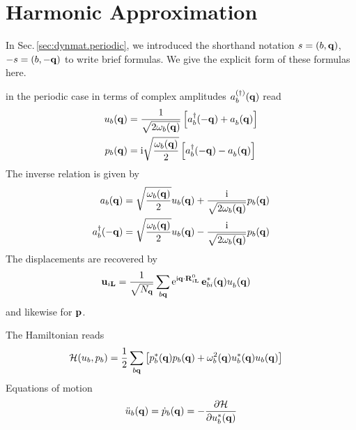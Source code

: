 \section{Harmonic Approximation}
\label{app:formulas.ha}
In Sec.\,\ref{sec:dynmat.periodic}, we introduced the shorthand notation $s=(b, {\bf q})$, $-s=(b, -{\bf q})$ to write brief formulas. We give the explicit form of these formulas here.

 in the periodic case in terms of complex amplitudes $a^{(\dagger)}_b ({\bf q})$ read
\begin{subequations}
	\label{eq:u_b(q).amplitudes}
	\begin{align}
	u_b (\b q)
	&=   \frac{1}{\sqrt{2 \omega_b (\b q)}} \left[ \D a_b (- \b q) + \fD a_b (\b q)  \right] \\
	p_b (\b q)
	&= \im \sqrt{\frac{\omega_b (\b q)}{2}} \left[ \D a_b (- \b q) - \fD a_b (\b q)  \right]
	\end{align}
	\end{subequations}
	The inverse relation is given by
	\begin{subequations}
		\begin{align}
		a_b ({\bf q})
		&= \sqrt{\frac{\omega_b ({\bf q})}{2}} u_b ({\bf q}) + \frac{{\rm i}}{\sqrt{2 \omega_b ({\bf q})}} p_b ({\bf q}) \\
		a^\dagger_b (-  {\bf q})
		&= \sqrt{\frac{\omega_b ({\bf q})}{2}} u_b ({\bf q}) - \frac{{\rm i}}{\sqrt{2 \omega_b ({\bf q})}} p_b ({\bf q})
		\end{align}
		\end{subequations}
		The displacements are recovered by
		\begin{align}
		\b u_{i \b L}
		&= \frac{1}{\sqrt{N_{\b q}}} \sum_{b \b q} {\rm e}^{\im  \b q \cdot \b R^0_{i \b L}} \, \b e^\ast_{b i} (\b q) \fD u_b (\b q)
		\end{align}
		and likewise for ${\bf p}$.
		
		The Hamiltonian reads
		\begin{align}
		\mathcal H (u_b, p_b)
		&= \frac{1}{2} \sum_{b {\bf q}} \left[ p^\ast_b ({\bf q}) p_b ({\bf q}) + \omega^2_b ({\bf q}) u^\ast_b ({\bf q}) u_b ({\bf q}) \right] 
		\end{align}
		Equations of motion
		\begin{align}
		\ddot{u}_b ({\bf q})
		= \dot{p}_b ({\bf q})
		= - \frac{\partial \mathcal{H}}{\partial u_b^\ast ({\bf q})}
		\end{align}

